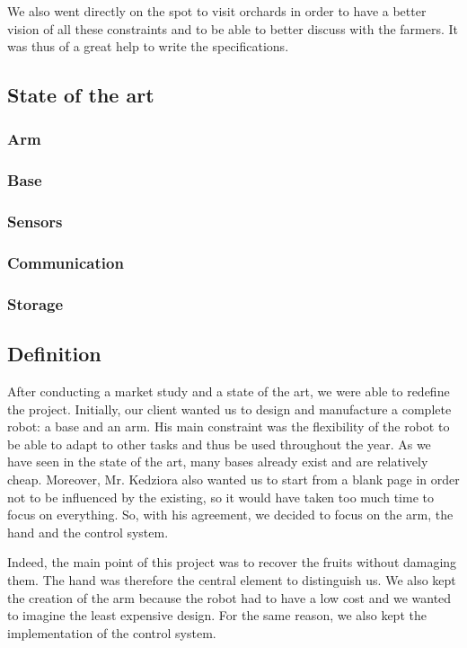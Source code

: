\bigbreak
We also went directly on the spot to visit orchards in order to have a better vision of all these constraints and to be able to better discuss with the farmers. It was thus of a great help to write the specifications. 

\subsection{State of the art}

\subsubsection{Arm}

\subsubsection{Base}

\subsubsection{Sensors}

\subsubsection{Communication}

\subsubsection{Storage}

\subsection{Definition}

After conducting a market study and a state of the art, we were able to redefine the project. Initially, our client wanted us to design and manufacture a complete robot: a base and an arm. His main constraint was the flexibility of the robot to be able to adapt to other tasks and thus be used throughout the year. As we have seen in the state of the art, many bases already exist and are relatively cheap. Moreover, Mr. Kedziora also wanted us to start from a blank page in order not to be influenced by the existing, so it would have taken too much time to focus on everything. So, with his agreement, we decided to focus on the arm, the hand and the control system. 

\bigbreak
Indeed, the main point of this project was to recover the fruits without damaging them. The hand was therefore the central element to distinguish us. We also kept the creation of the arm because the robot had to have a low cost and we wanted to imagine the least expensive design. For the same reason, we also kept the implementation of the control system. 

